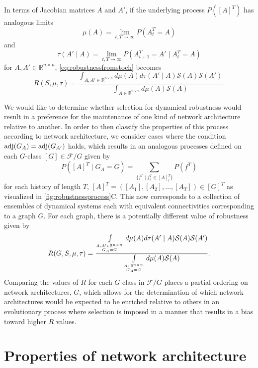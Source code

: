 In terms of Jacobian matrices $A$ and $A'$, if the underlying process $P([A]^T)$ has analogous limits
$$\mu(A) = \lim_{t,T \rightarrow \infty} P(A_t^T=A)$$
and
$$\tau(A' \mid A) = \lim_{t,T \rightarrow \infty} P(A_{t+1}^T = A' \mid A_t^T = A)$$
for $A,A' \in \mathbb{R}^{n \times n}$, \ref{eq:robustnessfromstoch} becomes
\begin{equation}\label{eq:robustnessonjacobians}
R(S,\mu,\tau) = \frac{\int_{A,A' \in \mathbb{R}^{n \times n}} d\mu(A) d\tau(A' \mid A) \mathcal{S}(A) \mathcal{S}(A')}{\int_{A \in \mathbb{R}^{n \times n}} d\mu(A) \mathcal{S}(A)}.
\end{equation}

We would like to determine whether selection for dynamical robustness would result in a preference for the maintenance of one kind of network architecture relative to another. In order to then classify the properties of this process according to network architecture, we consider cases where the condition $\mathrm{adj}(G_A) = \mathrm{adj}(G_{A'})$ holds, which results in an analogous processes defined on each $G$-class $[G] \in \mathcal{F}/G$ given by
$$
P([A]^T \mid G_A {=} G) = \sum_{ \{ f^T \mid f_i^T \in [A]_i^T \} } P(f^T)
$$
for each history of length $T$, $[A]^T = ( [A_1], [A_2], \ldots, [A_T] ) \in [G]^T$
as visualized in \ref{fig:robustnessprocess}C. This now corresponds to a collection of ensembles of dynamical systems each with equivalent connectivities corresponding to a graph $G$. For each graph, there is a potentially different value of robustness given by
\begin{equation}\label{eq:robustnessbygraph}
\begin{aligned}
R(G,S,\mu,\tau)  =
 \frac{\int\limits_{A,A' \in \mathbb{R}^{n \times n} \atop G_A = G} d\mu(A) d\tau(A' \mid A) \mathcal{S}(A) \mathcal{S}(A')}{\int\limits_{A \in \mathbb{R}^{n \times n} \atop G_A = G} d\mu(A) \mathcal{S}(A)}.
\end{aligned}
\end{equation}
Comparing the values of $R$ for each $G$-class in $\mathcal{F}/G$ places a partial ordering on network architectures, $G$, which allows for the determination of which network architectures would be expected to be enriched relative to others in an evolutionary process where selection is imposed in a manner that results in a bias toward higher $R$ values.

\section{Properties of network architecture}

